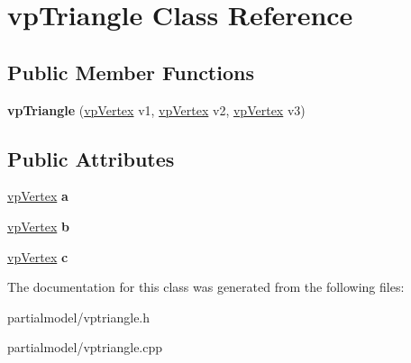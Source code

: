 \hypertarget{classvpTriangle}{}\section{vp\+Triangle Class Reference}
\label{classvpTriangle}
\subsection*{Public Member Functions}
\begin{DoxyCompactItemize}
\item 
{\bfseries vp\+Triangle} (\hyperlink{classvpVertex}{vp\+Vertex} v1, \hyperlink{classvpVertex}{vp\+Vertex} v2, \hyperlink{classvpVertex}{vp\+Vertex} v3)\hypertarget{classvpTriangle_afcf460b224661ae457af66dc8ead5926}{}\label{classvpTriangle_afcf460b224661ae457af66dc8ead5926}

\end{DoxyCompactItemize}
\subsection*{Public Attributes}
\begin{DoxyCompactItemize}
\item 
\hyperlink{classvpVertex}{vp\+Vertex} {\bfseries a}\hypertarget{classvpTriangle_a83917be37c07ba8368a313c2bfb9d346}{}\label{classvpTriangle_a83917be37c07ba8368a313c2bfb9d346}

\item 
\hyperlink{classvpVertex}{vp\+Vertex} {\bfseries b}\hypertarget{classvpTriangle_afe5486a0daf3bd954c98ac6a894c46ec}{}\label{classvpTriangle_afe5486a0daf3bd954c98ac6a894c46ec}

\item 
\hyperlink{classvpVertex}{vp\+Vertex} {\bfseries c}\hypertarget{classvpTriangle_a4fbff84da01f97fd84abf3b73bc2f25e}{}\label{classvpTriangle_a4fbff84da01f97fd84abf3b73bc2f25e}

\end{DoxyCompactItemize}


The documentation for this class was generated from the following files\+:\begin{DoxyCompactItemize}
\item 
partialmodel/vptriangle.\+h\item 
partialmodel/vptriangle.\+cpp\end{DoxyCompactItemize}
